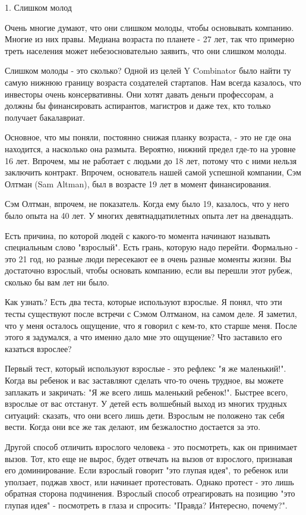 \documentclass[ebook,12pt,oneside,openany]{memoir}
\begin{document}
1. Слишком молод

Очень многие думают, что они слишком молоды, чтобы основывать
компанию. Многие из них правы. Медиана возраста по планете - 27 лет,
так что примерно треть населения может небезосновательно заявить, что
они слишком молоды.

Слишком молоды - это сколько? Одной из целей Y Combinator было найти
ту самую нижнюю границу возраста создателей стартапов. Нам всегда
казалось, что инвесторы очень консервативны. Они хотят давать деньги
профессорам, а должны бы финансировать аспирантов, магистров и даже
тех, кто только получает бакалавриат.

Основное, что мы поняли, постоянно снижая планку возраста, - это не
где она находится, а насколько она размыта. Вероятно, нижний предел
где-то на уровне 16 лет. Впрочем, мы не работает с людьми до 18 лет,
потому что с ними нельзя заключить контракт. Впрочем, основатель нашей
самой успешной компании, Сэм Олтман (Sam Altman), был в возрасте 19
лет в момент финансирования.

Сэм Олтман, впрочем, не показатель. Когда ему было 19, казалось, что у
него было опыта на 40 лет. У многих девятнадцатилетных опыта лет на
двенадцать.

Есть причина, по которой людей с какого-то момента начинают называть
специальным слово "взрослый". Есть грань, которую надо перейти.
Формально - это 21 год, но разные люди пересекают ее в очень разные
моменты жизни. Вы достаточно взрослый, чтобы основать компанию, если
вы перешли этот рубеж, сколько бы вам лет ни было.

Как узнать? Есть два теста, которые используют взрослые. Я понял, что
эти тесты существуют после встречи с Сэмом Олтманом, на самом деле. Я
заметил, что у меня осталось ощущение, что я говорил с кем-то, кто
старше меня. После этого я задумался, а что именно дало мне это
ощущение? Что заставило его казаться взрослее?

Первый тест, который используют взрослые - это рефлекс "я же
маленький!". Когда вы ребенок и вас заставляют сделать что-то очень
трудное, вы можете заплакать и закричать: "Я же всего лишь маленький
ребенок!". Быстрее всего, взрослые от вас отстанут. У детей есть
волшебный выход из многих трудных ситуаций: сказать, что они всего
лишь дети. Взрослым не положено так себя вести. Когда они все же так
делают, им безжалостно достается за это.

Другой способ отличить взрослого человека - это посмотреть, как он
принимает вызов. Тот, кто еще не вырос, будет отвечать на вызов от
взрослого, признавая его доминирование. Если взрослый говорит "это
глупая идея", то ребенок или уползает, поджав хвост, или начинает
протестовать. Однако протест - это лишь обратная сторона подчинения.
Взрослый способ отреагировать на позицию "это глупая идея" -
посмотреть в глаза и спросить: "Правда? Интересно, почему?".
\end{document}
